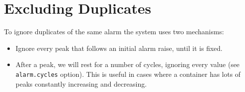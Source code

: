 \section{Excluding Duplicates}

To ignore duplicates of the same alarm the system uses two mechanisms:

\begin{itemize}
    \item Ignore every peak that follows an initial alarm raise, until it is fixed.
    \item After a peak, we will rest for a number of cycles, ignoring every value (see \texttt{alarm.cycles} option). This is useful in cases where a container has lots of peaks constantly increasing and decreasing.
\end{itemize}
